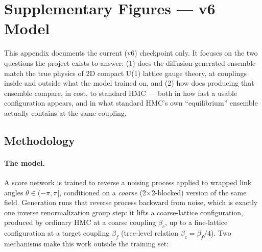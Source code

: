 
\section{Supplementary Figures --- v6 Model}
\label{sec:appendix}

This appendix documents the current (v6) checkpoint only. It focuses on the
two questions the project exists to answer: (1) does the diffusion-generated
ensemble match the true physics of 2D compact U(1) lattice gauge theory, at
couplings inside and outside what the model trained on, and (2) how does
producing that ensemble compare, in cost, to standard HMC --- both in how
fast a usable configuration appears, and in what standard HMC's own
``equilibrium'' ensemble actually contains at the same coupling.

\subsection{Methodology}
\label{sec:appendix-methods}

\paragraph{The model.} A score network is trained to reverse a noising
process applied to wrapped link angles $\theta \in (-\pi, \pi]$, conditioned
on a \emph{coarse} (2$\times$2-blocked) version of the same field.
Generation runs that reverse process backward from noise, which is exactly
one inverse renormalization group step: it lifts a coarse-lattice
configuration, produced by ordinary HMC at a coarse coupling $\beta_c$, up
to a fine-lattice configuration at a target coupling $\beta_f$ (tree-level
relation $\beta_c = \beta_f / 4$). Two mechanisms make this work outside the
training set:


